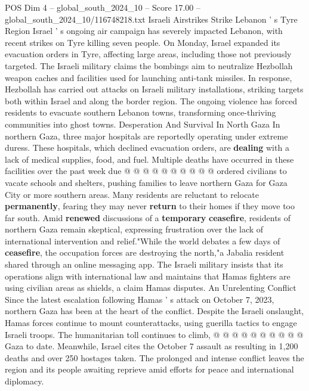 \begin{textsample}{POS Dim 4 – global\_south\_2024\_10 – Score 17.00 – global\_south\_2024\_10/116748218.txt}
Israeli Airstrikes Strike Lebanon ' s Tyre Region Israel ' s ongoing air campaign has severely impacted Lebanon, with recent strikes on Tyre killing seven people.
On Monday, Israel expanded its evacuation orders in Tyre, affecting large areas, including those not previously targeted.
The Israeli military claims the bombings aim to neutralize Hezbollah weapon caches and facilities used for launching anti-tank missiles.
In response, Hezbollah has carried out attacks on Israeli military installations, striking targets both within Israel and along the border region.
The ongoing violence has forced residents to evacuate southern Lebanon towns, transforming once-thriving communities into ghost towns.
Desperation And Survival In North Gaza In northern Gaza, three major hospitals are reportedly operating under extreme duress.
These hospitals, which declined evacuation orders, are \textbf{dealing} with a lack of medical supplies, food, and fuel.
Multiple deaths have occurred in these facilities over the past week due @ @ @ @ @ @ @ @ @ @ ordered civilians to vacate schools and shelters, pushing families to leave northern Gaza for Gaza City or more southern areas.
Many residents are reluctant to relocate \textbf{permanently}, fearing they may never \textbf{return} to their homes if they move too far south.
Amid \textbf{renewed} discussions of a \textbf{temporary} \textbf{ceasefire}, residents of northern Gaza remain skeptical, expressing frustration over the lack of international intervention and relief."While the world debates a few days of \textbf{ceasefire}, the occupation forces are destroying the north,"a Jabalia resident shared through an online messaging app.
The Israeli military insists that its operations align with international law and maintains that Hamas fighters are using civilian areas as shields, a claim Hamas disputes.
An Unrelenting Conflict Since the latest escalation following Hamas ' s attack on October 7, 2023, northern Gaza has been at the heart of the conflict.
Despite the Israeli onslaught, Hamas forces continue to mount counterattacks, using guerilla tactics to engage Israeli troops.
The humanitarian toll continues to climb, @ @ @ @ @ @ @ @ @ @ Gaza to date.
Meanwhile, Israel cites the October 7 assault as resulting in 1,200 deaths and over 250 hostages taken.
The prolonged and intense conflict leaves the region and its people awaiting reprieve amid efforts for peace and international diplomacy.

\end{textsample}
